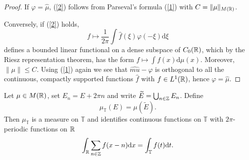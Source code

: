\begin{proof}
  If $\varphi=\hat{\mu}$, (\ref{2}) follows from Parseval's formula (\ref{1}) with $C=\|\mu\|_{M(\mathbb{R})}$.

  Conversely, if (\ref{2}) holds, 
   \[
     f \mapsto \frac{1}{2\pi}\int \hat{f}(\xi)\varphi(-\xi)\mathrm{d}\xi
   \] defines a bounded linear functional on a dense subspace of $C_0(\mathbb{R})$, which by the Riesz representation theorem, has the form $f\mapsto \int f(x)\mathrm{d}\mu(x)$. Moreover, $\|\mu\|\le C$. Using (\ref{1}) again we see that $\hat{mu}-\varphi$ is orthogonal to all the continuous, compactly supported functions $\hat{f}$ with $f\in L^{1}(\mathbb{R})$, hence $\varphi=\hat{\mu}$.
\end{proof}

\begin{definition}
  Let $\mu \in M(\mathbb{R})$, set $E_n=E+2\pi n$ and write $\widetilde{E}=\bigcup_{n\in \mathbb{Z}} E_n$. Define 
  \[
    \mu_{\mathbb{T}}(E)=\mu(\widetilde{E}).
  \] 
  Then $\mu_{\mathbb{T}}$ is a measure on $\mathbb{T}$ and identifies continuous functions on $\mathbb{T}$ with $2\pi$-periodic functions on $\mathbb{R}$ 
  \begin{equation}
    \int_{\mathbb{R}}\sum_{n \in \mathbb{Z}}f(x-n)\mathrm{d}x= \int_{\mathbb{T}}f(t)\mathrm{d}t.
  \end{equation}
\end{definition}


